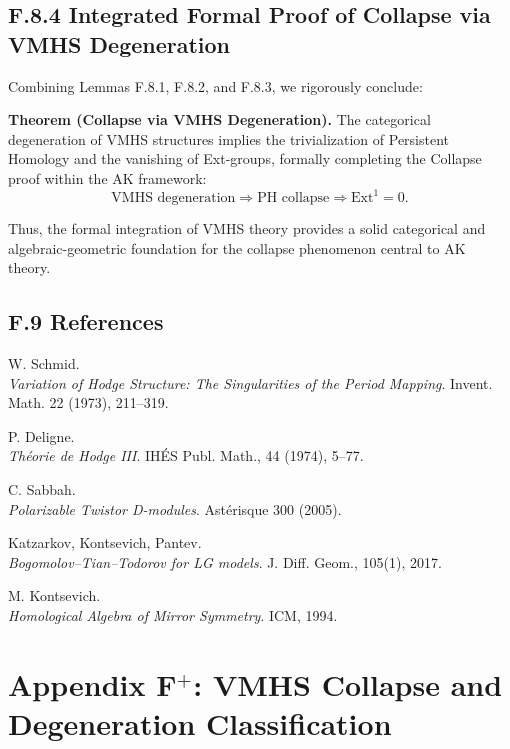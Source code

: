 \documentclass[11pt]{article}
\begin{document}
\subsection*{F.8.4 Integrated Formal Proof of Collapse via VMHS Degeneration}
Combining Lemmas F.8.1, F.8.2, and F.8.3, we rigorously conclude:

\textbf{Theorem (Collapse via VMHS Degeneration).}  
The categorical degeneration of VMHS structures implies the trivialization of Persistent Homology and the vanishing of Ext-groups, formally completing the Collapse proof within the AK framework:
\[
\text{VMHS degeneration} \Longrightarrow \text{PH collapse} \Longrightarrow \text{Ext}^1 = 0.
\]

Thus, the formal integration of VMHS theory provides a solid categorical and algebraic-geometric foundation for the collapse phenomenon central to AK theory.



\subsection*{F.9 References}

\begin{thebibliography}{9}

W. Schmid.\\
\textit{Variation of Hodge Structure: The Singularities of the Period Mapping}.  
Invent. Math. 22 (1973), 211–319.

P. Deligne.\\
\textit{Théorie de Hodge III}.  
IHÉS Publ. Math., 44 (1974), 5–77.

C. Sabbah.\\
\textit{Polarizable Twistor D-modules}.  
Astérisque 300 (2005).

Katzarkov, Kontsevich, Pantev.\\
\textit{Bogomolov–Tian–Todorov for LG models}.  
J. Diff. Geom., 105(1), 2017.

M. Kontsevich.\\
\textit{Homological Algebra of Mirror Symmetry}.  
ICM, 1994.

\end{thebibliography}


\section*{Appendix F$^+$: VMHS Collapse and Degeneration Classification}
\end{document}
